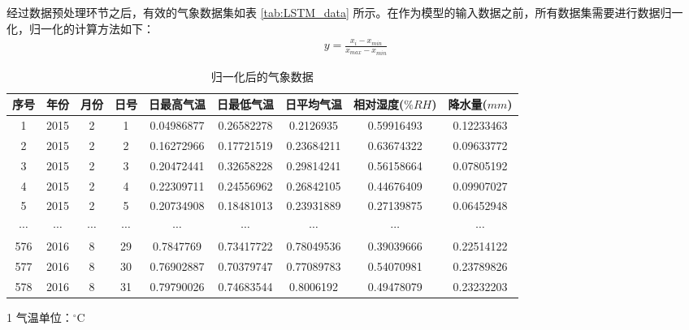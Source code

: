 经过数据预处理环节之后，有效的气象数据集如表 \ref{tab:LSTM_data} 所示。在作为模型的输入数据之前，所有数据集需要进行数据归一化，归一化的计算方法如下：
\begin{align}
    y = \frac{x_i-x_{min}}{x_{max}-x_{min}}
\end{align}


\begin{table}[!ht]
    \caption{归一化后的气象数据}\label{tab:LSTM_data——normalization}
    \centering
    \resizebox{1.0\linewidth}{!}
    {\begin{threeparttable}          %
    \begin{tabular}{*9{c}}\toprule
        序号 & 年份 & 月份 & 日号 & 日最高气温\tnote{1} & 日最低气温\tnote{1} & 日平均气温\tnote{1}  & 相对湿度($\%RH$) & 降水量($mm$) \\ 
        \midrule
        1 & 2015 & 2 & 1 & 0.04986877 & 0.26582278 & 0.2126935 & 0.59916493 & 0.12233463 \\ 
        2 & 2015 & 2 & 2 & 0.16272966 & 0.17721519 & 0.23684211 & 0.63674322 & 0.09633772 \\ 
        3 & 2015 & 2 & 3 & 0.20472441 & 0.32658228 & 0.29814241 & 0.56158664 & 0.07805192 \\ 
        4 & 2015 & 2 & 4 & 0.22309711 & 0.24556962 & 0.26842105 & 0.44676409 & 0.09907027 \\ 
        5 & 2015 & 2 & 5 & 0.20734908 & 0.18481013 & 0.23931889 & 0.27139875 & 0.06452948 \\ 
        $\cdots$ & $\cdots$ & $\cdots$ & $\cdots$ & $\cdots$ & $\cdots$ & $\cdots$ & $\cdots$ & $\cdots$ \\ 
        576 & 2016 & 8 & 29 & 0.7847769 & 0.73417722 & 0.78049536 & 0.39039666 & 0.22514122 \\ 
        577 & 2016 & 8 & 30 & 0.76902887 & 0.70379747 & 0.77089783 & 0.54070981 & 0.23789826 \\ 
        578 & 2016 & 8 & 31 & 0.79790026 & 0.74683544  & 0.8006192 & 0.49478079 & 0.23232203 \\ 
        \bottomrule
    \end{tabular}
    \begin{tablenotes}    
        \small              
        \item[1] 气温单位：${}^{\circ}\text{C}$
    \end{tablenotes}          
    \end{threeparttable}}
    \vspace{-0.8em}
\end{table}

